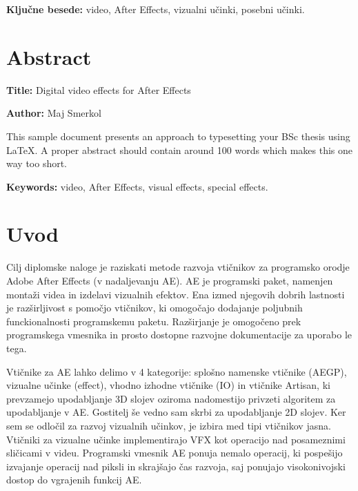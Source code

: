 \documentclass[a4paper, 12pt]{book}
\newcommand{\ttitleEn}{Digital video effects for After Effects}
\newcommand{\tauthor}{Maj Smerkol}
\newcommand{\tkeywords}{video, After Effects, vizualni učinki, posebni učinki}
\newcommand{\tkeywordsEn}{video, After Effects, visual effects, special effects}
\newcommand{\clearemptydoublepage}{\newpage{\pagestyle{empty}\cleardoublepage}}
\begin{document}
\bigskip

\noindent\textbf{Ključne besede:} \tkeywords.
\clearemptydoublepage

\chapter*{Abstract}

\noindent\textbf{Title:} \ttitleEn
\bigskip

\noindent\textbf{Author:} \tauthor
\bigskip

\noindent This sample document presents an approach to typesetting your BSc thesis using \LaTeX. 
A proper abstract should contain around 100 words which makes this one way too short.
\bigskip

\noindent\textbf{Keywords:} \tkeywordsEn.
\clearemptydoublepage

\mainmatter
\setcounter{page}{1}
\pagestyle{fancy}

\chapter{Uvod}

Cilj diplomske naloge je raziskati metode razvoja vtičnikov za programsko orodje Adobe After Effects (v nadaljevanju AE). 
AE je programski paket, namenjen montaži videa in izdelavi vizualnih efektov. 
Ena izmed njegovih dobrih lastnosti je razširljivost s pomočjo vtičnikov, ki omogočajo dodajanje poljubnih funckionalnosti programskemu paketu. 
Razširjanje je omogočeno prek programskega vmesnika in prosto dostopne razvojne dokumentacije za uporabo le tega. 

Vtičnike za AE lahko delimo v 4 kategorije: 
splošno namenske vtičnike (AEGP), 
vizualne učinke (effect), 
vhodno izhodne vtičnike (IO) in 
vtičnike Artisan, ki prevzamejo upodabljanje 3D slojev oziroma nadomestijo privzeti algoritem za upodabljanje v AE. 
Gostitelj še vedno sam skrbi za upodabljanje 2D slojev. 
Ker sem se odločil za razvoj vizualnih učinkov, je izbira med tipi vtičnikov jasna. 
Vtičniki za vizualne učinke implementirajo VFX kot operacijo nad posameznimi sličicami v videu. 
Programski vmesnik AE ponuja nemalo operacij, ki pospešijo izvajanje operacij nad piksli in skrajšajo čas razvoja, saj ponujajo visokonivojski dostop do vgrajenih funkcij AE. 
\end{document}

